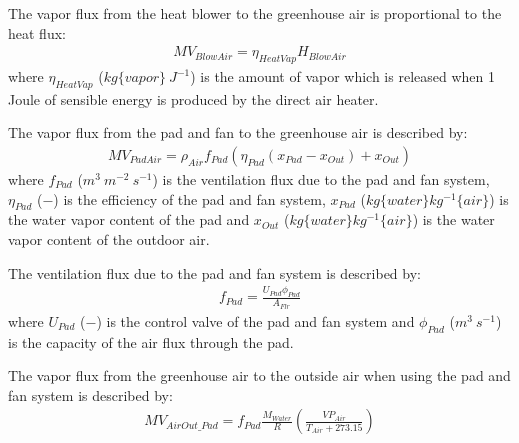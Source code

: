 \documentclass[a4paper]{article}
\numberwithin{equation}{section}
\begin{document}
The vapor flux from the heat blower to the greenhouse air is proportional to the heat flux:
\begin{align}
  MV_{BlowAir} = \eta_{HeatVap} H_{BlowAir}
\end{align}
where \(\eta_{HeatVap}\) (\(kg\{vapor\}\ J^{-1}\)) is the amount of vapor which is released when 1 Joule of sensible energy is produced by the direct air heater.

The vapor flux from the pad and fan to the greenhouse air is described by:
\begin{align}
  MV_{PadAir} = \rho_{Air} f_{Pad} (\eta_{Pad} (x_{Pad} - x_{Out}) + x_{Out})
\end{align}
where \(f_{Pad}\) (\(m^3\ m^{-2}\ s^{-1}\)) is the ventilation flux due to the pad and fan system, \(\eta_{Pad}\) (\(-\)) is the efficiency of the pad and fan system, \(x_{Pad}\) (\(kg\{water\} kg^{-1}\{air\}\)) is the water vapor content of the pad and \(x_{Out}\) (\(kg\{water\} kg^{-1}\{air\}\)) is the water vapor content of the outdoor air.

The ventilation flux due to the pad and fan system is described by:
\begin{align}
  f_{Pad} = \frac{U_{Pad} \phi_{Pad}}{A_{Flr}}
\end{align}
where \(U_{Pad}\) (\(-\)) is the control valve of the pad and fan system and \(\phi_{Pad}\) (\(m^3\ s^{-1}\)) is the capacity of the air flux through the pad.

The vapor flux from the greenhouse air to the outside air when using the pad and fan system is described by:
\begin{align}
  MV_{AirOut\_Pad} = f_{Pad} \frac{M_{Water}}{R} \left(\frac{VP_{Air}}{T_{Air} + 273.15}\right)
\end{align}
\end{document}
